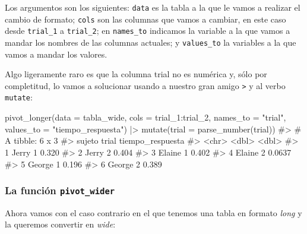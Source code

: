 \documentclass[
  letterpaper,
  DIV=11,
  numbers=noendperiod,
  oneside]{scrreprt}
\newenvironment{Shaded}{\begin{snugshade}}{\end{snugshade}}
\newcommand{\AttributeTok}[1]{\textcolor[rgb]{0.40,0.45,0.13}{#1}}
\newcommand{\CommentTok}[1]{\textcolor[rgb]{0.37,0.37,0.37}{#1}}
\newcommand{\FunctionTok}[1]{\textcolor[rgb]{0.28,0.35,0.67}{#1}}
\newcommand{\NormalTok}[1]{\textcolor[rgb]{0.00,0.23,0.31}{#1}}
\newcommand{\SpecialCharTok}[1]{\textcolor[rgb]{0.37,0.37,0.37}{#1}}
\newcommand{\StringTok}[1]{\textcolor[rgb]{0.13,0.47,0.30}{#1}}
\begin{document}
Los argumentos son los siguientes: \texttt{data} es la tabla a la que le
vamos a realizar el cambio de formato; \texttt{cols} son las columnas
que vamos a cambiar, en este caso desde \texttt{trial\_1} a
\texttt{trial\_2}; en \texttt{names\_to} indicamos la variable a la que
vamos a mandar los nombres de las columnas actuales; y
\texttt{values\_to} la variables a la que vamos a mandar los valores.

Algo ligeramente raro es que la columna trial no es numérica y, sólo por
completitud, lo vamos a solucionar usando a nuestro gran amigo
\texttt{\textbar{}\textgreater{}} y al verbo \texttt{mutate}:

\begin{Shaded}
\begin{Highlighting}[]
\FunctionTok{pivot\_longer}\NormalTok{(}\AttributeTok{data =}\NormalTok{ tabla\_wide, }
             \AttributeTok{cols =}\NormalTok{ trial\_1}\SpecialCharTok{:}\NormalTok{trial\_2, }
             \AttributeTok{names\_to =} \StringTok{"trial"}\NormalTok{,}
             \AttributeTok{values\_to =} \StringTok{"tiempo\_respuesta"}\NormalTok{) }\SpecialCharTok{|\textgreater{}}
  \FunctionTok{mutate}\NormalTok{(}\AttributeTok{trial =} \FunctionTok{parse\_number}\NormalTok{(trial))}
\CommentTok{\#\textgreater{} \# A tibble: 6 x 3}
\CommentTok{\#\textgreater{}   sujeto trial tiempo\_respuesta}
\CommentTok{\#\textgreater{}   \textless{}chr\textgreater{}  \textless{}dbl\textgreater{}            \textless{}dbl\textgreater{}}
\CommentTok{\#\textgreater{} 1 Jerry      1           0.320 }
\CommentTok{\#\textgreater{} 2 Jerry      2           0.404 }
\CommentTok{\#\textgreater{} 3 Elaine     1           0.402 }
\CommentTok{\#\textgreater{} 4 Elaine     2           0.0637}
\CommentTok{\#\textgreater{} 5 George     1           0.196 }
\CommentTok{\#\textgreater{} 6 George     2           0.389}
\end{Highlighting}
\end{Shaded}

\hypertarget{la-funciuxf3n-pivot_wider}{%
\subsubsection{\texorpdfstring{La función
\texttt{pivot\_wider}}{La función pivot\_wider}}\label{la-funciuxf3n-pivot_wider}}

Ahora vamos con el caso contrario en el que tenemos una tabla en formato
\emph{long} y la queremos convertir en \emph{wide}:
\end{document}
